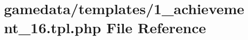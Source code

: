 \hypertarget{1__achievement__16_8tpl_8php}{\section{gamedata/templates/1\+\_\+achievement\+\_\+16.tpl.\+php File Reference}
\label{1__achievement__16_8tpl_8php}
}
